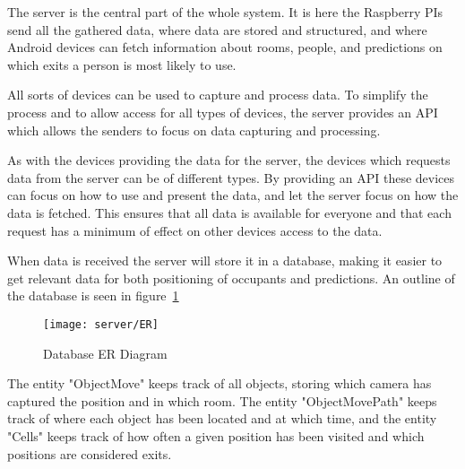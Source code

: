 The server is the central part of the whole system. It is here the Raspberry PIs send all the gathered data, where data are stored and structured, and where Android devices can fetch information about rooms, people, and predictions on which exits a person is most likely to use.

All sorts of devices can be used to capture and process data. To simplify the process and to allow access for all types of devices, the server provides an API which allows the senders to focus on data capturing and processing.

As with the devices providing the data for the server, the devices which requests data from the server can be of different types. By providing an API these devices can focus on how to use and present the data, and let the server focus on how the data is fetched. This ensures that all data is available for everyone and that each request has a minimum of effect on other devices access to the data.

When data is received the server will store it in a database, making it easier to get relevant data for both positioning of occupants and predictions. An outline of the database is seen in figure~\ref{fig:database_er_diagram} 

\begin{figure}[htb]
	\centering
	\texttt{[image: server/ER]}
	\caption{Database ER Diagram}
	\label{fig:database_er_diagram}
\end{figure}

The entity "ObjectMove" keeps track of all objects, storing which camera has captured the position and in which room. The entity "ObjectMovePath" keeps track of where each object has been located and at which time, and the entity "Cells" keeps track of how often a given position has been visited and which positions are considered exits.